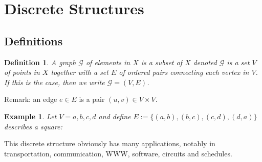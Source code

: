 \documentclass[9pt]{article} %
\newtheorem*{def_}{Definition}
\newtheorem{ex}{Example}
\newcommand{\G}{\mathcal{G}}
\begin{document}
	\section{\large Discrete Structures}
		\subsection*{Definitions}
		\begin{def_}
			A graph $\mathcal{G}$ of elements in $X$ is a subset of $X$ denoted $\G$  is a set $V$ of points in $X$ together with a set $E$ of ordered pairs connecting each vertex in $V$. If this is the case, then we write $\G=(V,E)$.
		\end{def_}
		
		\noindent Remark: an edge $e \in E$ is a pair $(u,v) \in V \times V$.
		\begin{ex}
			Let $V = {a,b,c,d}$ and define $E := \{(a,b),(b,c), (c,d), (d,a) \}$ describes a square:
			\begin{center}
			\end{center}
		\end{ex}
		This discrete structure obviously has many applications, notably in transportation, communication, WWW, software, circuits and schedules. 
		
\end{document}

